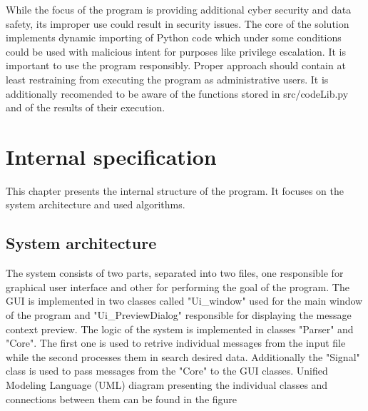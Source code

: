 \documentclass[a4paper,twoside,12pt]{book}
\begin{document}
While the focus of the program is providing additional cyber security and data safety, its 
improper use could result in security issues. The core of the solution implements
dynamic importing of Python code which under some conditions could be used with malicious
intent for purposes like privilege escalation. It is important to use the program 
responsibly. Proper approach should contain at least restraining from executing
the program as administrative users. It is additionally recomended to be aware of the 
functions stored in src/codeLib.py and of the results of their execution. 

\chapter{Internal specification}

This chapter presents the internal structure of the program. It focuses on the system architecture and used algorithms.


\section{System architecture}

The system consists of two parts, separated into two files, one responsible for graphical user interface and other for
performing the goal of the program. The GUI is implemented in two classes called "Ui\_window" used for the main window of the program and "Ui\_PreviewDialog" responsible for displaying 
the message context preview. The logic of the system is implemented in classes "Parser" and "Core". The first one is used to retrive individual messages from the input file while the second
processes them in search desired data. Additionally the "Signal" class is used to pass messages from the "Core" to the GUI classes. Unified Modeling Language (UML) diagram presenting the individual classes and connections between them can be found in the figure %
\end{document}

